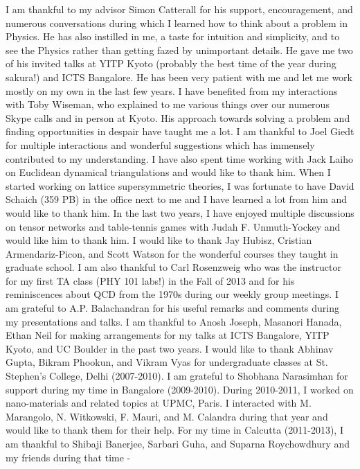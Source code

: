 \vspace*{2em}
I am thankful to my advisor Simon Catterall for his support, encouragement, and 
numerous conversations during which I learned how to 
think about a problem in Physics. He has also instilled in me, a taste for 
intuition and simplicity, and to see the Physics rather than getting fazed by 
unimportant details. He gave me two of his invited talks at YITP Kyoto 
(probably the best time of the year during sakura!) and ICTS Bangalore. He has been 
very patient with me and let me work mostly on my own in the last few years. 
I have benefited from my interactions with Toby Wiseman, who explained to me various things
over our numerous Skype calls and in person at Kyoto. His approach towards solving a problem and finding 
opportunities in despair have taught me a lot. I am thankful to Joel Giedt for multiple interactions 
and wonderful suggestions which has immensely contributed to my understanding.  
I have also spent time working with Jack Laiho on Euclidean dynamical triangulations and would like to thank
him. When I started working on lattice supersymmetric theories, 
I was fortunate to have David Schaich (359 PB) in the office next to me and I 
have learned a lot from him and would like to thank him. In the last two years, 
I have enjoyed multiple discussions on tensor networks and table-tennis games 
with Judah F. Unmuth-Yockey and would like him to thank him. I would like to thank 
Jay Hubisz, Cristian Armendariz-Picon, and Scott Watson 
for the wonderful courses they taught in graduate school. I am also thankful to 
Carl Rosenzweig who was the instructor for my first TA class (PHY 101 labs!) in the Fall 
of 2013 and for his reminiscences about QCD from the 1970s during our weekly group meetings.
I am grateful to A.P. Balachandran for his useful remarks and comments during my presentations 
and talks. I am thankful to Anosh Joseph, Masanori Hanada, Ethan Neil for
making arrangements for my talks at ICTS Bangalore, YITP Kyoto, and UC Boulder in 
the past two years.  
I would like to thank Abhinav Gupta, Bikram Phookun, and Vikram Vyas for undergraduate classes at  
St. Stephen's College, Delhi (2007-2010). I am grateful to Shobhana Narasimhan for support during my time
in Bangalore (2009-2010). During 2010-2011, I worked on nano-materials and related topics at UPMC, 
Paris. I interacted with M. Marangolo, N. Witkowski, F. Mauri, and M. Calandra during that year and would like
to thank them for their help. For my time in Calcutta (2011-2013), 
I am thankful to Shibaji Banerjee, Sarbari Guha, and Suparna Roychowdhury and my friends during that time - 
